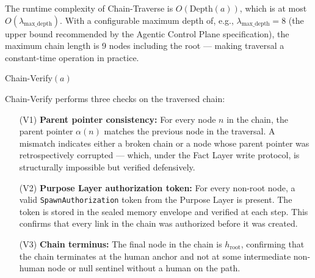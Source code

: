 The runtime complexity of Chain-Traverse is $O(\text{Depth}(a))$, which is at most $O(\lambda_{\text{max\_depth}})$. With a configurable maximum depth of, e.g., $\lambda_{\text{max\_depth}} = 8$ (the upper bound recommended by the Agentic Control Plane specification), the maximum chain length is 9 nodes including the root — making traversal a constant-time operation in practice.

\bigskip
\begin{algorithm}[H]
\caption{Chain-Verify$(a)$}
\label{alg:chain-verify}
\begin{algorithmic}[1]
\Require Agent $a \in \mathcal{N}$
\Ensure Boolean indicating whether $\Chain{a}$ is intact, authorized, and human-anchored}
\State $chain \leftarrow \text{Chain-Traverse}(a)$
\State $prev \leftarrow \bot$
\ForEach{node $n$ in $chain$}
    \State \Comment{Verify parent pointer consistency}
    \If{$n \neq a \land \alpha(n) \neq prev$}
        \State \Return \texttt{false} \Comment{Chain broken: parent mismatch}
    \EndIf
    \State \Comment{Verify Purpose Layer authorization token exists for each edge}
    \If{$n \neq h_{\text{root}}$}
        \State $W_n \leftarrow \text{GetAuthorizationToken}(n)$
        \If{$W_n = \texttt{null}$} \Comment{No valid authorization}
            \State \Return \texttt{false}
        \EndIf
    \EndIf
    \State $prev \leftarrow n$
\EndFor
\State \Comment{Verify chain terminates at human anchor}
\If{$\text{Terminus}(chain) \neq h_{\text{root}}$}
    \State \Return \texttt{false}
\EndIf
\State \Return \texttt{true}
\end{algorithmic}
\end{algorithm}

\medskip

Chain-Verify performs three checks on the traversed chain:

\begin{enumerate}
    \item[(V1)] \textbf{Parent pointer consistency:} For every node $n$ in the chain, the parent pointer $\alpha(n)$ matches the previous node in the traversal. A mismatch indicates either a broken chain or a node whose parent pointer was retrospectively corrupted — which, under the Fact Layer write protocol, is structurally impossible but verified defensively.
    \item[(V2)] \textbf{Purpose Layer authorization token:} For every non-root node, a valid \texttt{SpawnAuthorization} token from the Purpose Layer is present. The token is stored in the sealed memory envelope and verified at each step. This confirms that every link in the chain was authorized before it was created.
    \item[(V3)] \textbf{Chain terminus:} The final node in the chain is $h_{\text{root}}$, confirming that the chain terminates at the human anchor and not at some intermediate non-human node or null sentinel without a human on the path.
\end{enumerate}

